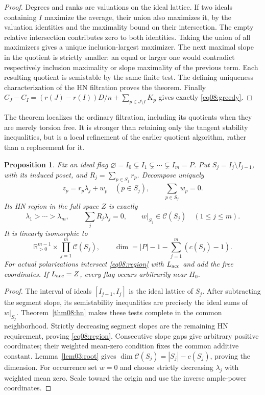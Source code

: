 \documentclass[11pt]{amsart}
\newtheorem{proposition}[theorem]{Proposition}
\theoremstyle{definition}
\theoremstyle{remark}
\newcommand{\RR}{\mathbb R}
\newcommand{\cC}{\mathcal C}
\begin{document}
\begin{proof}
Degrees and ranks are valuations on the ideal lattice. If two
ideals containing \(I\) maximize the average, their union also
maximizes it, by the valuation identities and the maximality bound
on their intersection. The empty relative intersection contributes
zero to both identities. Taking the union of all maximizers gives
a unique inclusion-largest maximizer. The next maximal slope in
the quotient is strictly smaller: an equal or larger one would
contradict respectively inclusion maximality or slope maximality
of the previous term. Each resulting quotient is semistable by
the same finite test. The defining uniqueness characterization of
the HN filtration proves the theorem. Finally
\(C_J-C_I=(r(J)-r(I))D/n+\sum_{p\in J\setminus I}K_p\)
gives exactly \eqref{eq08:greedy}.
\end{proof}

The theorem localizes the ordinary filtration, including its quotients
when they are merely torsion free. It is stronger than retaining only
the tangent stability inequalities, but is a local refinement of the
earlier quotient algorithm, rather than a replacement for it.

\begin{proposition}\label{prop08:products}
Fix an ideal flag
\(\varnothing=I_0\subsetneq I_1\subsetneq\cdots\subsetneq I_m=P\).
Put \(S_j=I_j\setminus I_{j-1}\), with its induced poset, and
\(R_j=\sum_{p\in S_j}r_p\). Decompose uniquely
\[
 z_p=r_p\lambda_j+w_p\quad(p\in S_j),\qquad
 \sum_{p\in S_j}w_p=0.
\]
Its HN region in the full space \(Z\) is exactly
\begin{equation}\label{eq08:region}
 \lambda_1>\cdots>\lambda_m,\qquad
 \sum_jR_j\lambda_j=0,\qquad
 w|_{S_j}\in\cC(S_j)\quad(1\le j\le m).
\end{equation}
It is linearly isomorphic to
\begin{equation}\label{eq08:product}
 \RR_{>0}^{m-1}\times\prod_{j=1}^m\cC(S_j),\qquad
 \dim=|P|-1-\sum_{j=1}^m(c(S_j)-1).
\end{equation}
For actual polarizations intersect \eqref{eq08:region} with
\(L_{\rm acc}\) and add the free coordinates. If \(L_{\rm acc}=Z\),
every flag occurs arbitrarily near \(H_0\).
\end{proposition}

\begin{proof}
The interval of ideals \([I_{j-1},I_j]\) is the ideal lattice of
\(S_j\). After subtracting the segment slope, its semistability
inequalities are precisely the ideal sums of \(w|_{S_j}\).
Theorem~\ref{thm08:hn} makes these tests complete in the common
neighborhood. Strictly decreasing segment slopes are the remaining
HN requirement, proving \eqref{eq08:region}. Consecutive slope
gaps give arbitrary positive coordinates; their weighted mean-zero
condition fixes the common additive constant. Lemma~\ref{lem03:root}
gives \(\dim\cC(S_j)=|S_j|-c(S_j)\), proving the dimension.
For occurrence set \(w=0\) and choose strictly decreasing
\(\lambda_j\) with weighted mean zero. Scale toward the origin
and use the inverse ample-power coordinates.
\end{proof}
\end{document}
